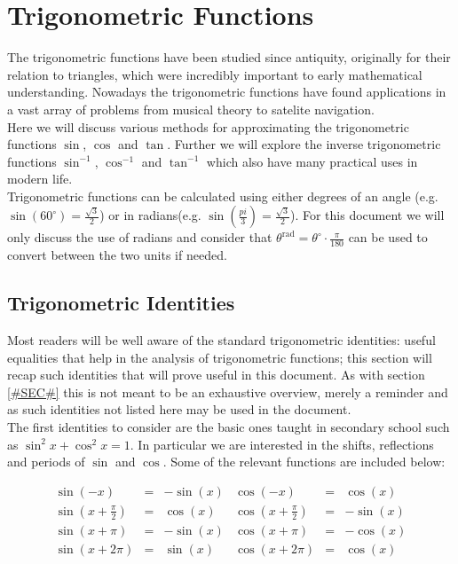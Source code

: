 \section{Trigonometric Functions}

The trigonometric functions have been studied since antiquity, originally for their relation to triangles, which were incredibly important to early mathematical understanding. Nowadays the trigonometric functions have found applications in a vast array of problems from musical theory to satelite navigation.\\

Here we will discuss various methods for approximating the trigonometric functions \(\sin\), \(\cos\) and \(\tan\). Further we will explore the inverse trigonometric functions \(\sin^{-1}\), \(\cos^{-1}\) and \(\tan^{-1}\) which also have many practical uses in modern life.\\

Trigonometric functions can be calculated using either degrees of an angle (e.g. \(\sin(60^{\circ}) = \frac{\sqrt{3}}{2}\)) or in radians(e.g. \(\sin(\frac{pi}{3}) = \frac{\sqrt{3}}{2}\)). For this document we will only discuss the use of radians and consider that \(\theta^\textrm{rad} = \theta^\circ \cdot \frac{\pi}{180}\) can be used to convert between the two units if needed.

\subsection{Trigonometric Identities}

Most readers will be well aware of the standard trigonometric identities: useful equalities that help in the analysis of trigonometric functions; this section will recap such identities that will prove useful in this document. As with section \ref{#SEC#} this is not meant to be an exhaustive overview, merely a reminder and as such identities not listed here may be used in the document.\\

The first identities to consider are the basic ones taught in secondary school such as \(\sin^2x + \cos^2x = 1\). In particular we are interested in the shifts, reflections and periods of \(\sin\) and \(\cos\). Some of the relevant functions are included below:

\begin{displaymath}
\begin{array}{rclrcl}
	\sin(-x) &=& -\sin(x) &\cos(-x) &=& \cos(x)\\
	\sin(x + \tfrac{\pi}{2}) &=& \cos(x) 
		&\cos(x + \tfrac{\pi}{2}) &=& -\sin(x)\\
	\sin(x + \pi) &=& -\sin(x) &\cos(x + \pi) &=& -\cos(x)\\
	\sin(x + 2\pi) &=& \sin(x) &\cos(x + 2\pi) &=& \cos(x)
\end{array}
\end{displaymath}

